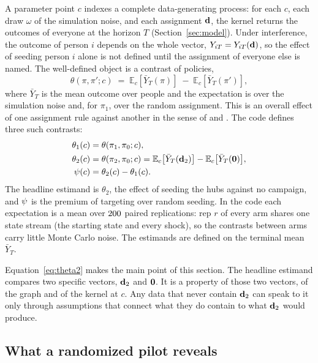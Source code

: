 A parameter point $c$ indexes a complete data-generating process: for each $c$,
each draw $\omega$ of the simulation noise, and each assignment $\mathbf{d}$, the
kernel returns the outcomes of everyone at the horizon $T$
(Section~\ref{sec:model}). Under interference, the outcome of person $i$ depends
on the whole vector, $Y_{iT}=Y_{iT}(\mathbf{d})$, so the effect of seeding person $i$
alone is not defined until the assignment of everyone else is named. The
well-defined object is a contrast of policies,
\begin{equation}\label{eq:theta}
  \theta(\pi,\pi';c)
  \;=\;
  \mathbb{E}_c\!\left[\bar Y_T(\pi)\right]
  \;-\;
  \mathbb{E}_c\!\left[\bar Y_T(\pi')\right],
\end{equation}
where $\bar Y_T$ is the mean outcome over people and the expectation is over the
simulation noise and, for $\pi_1$, over the random assignment. This is an overall
effect of one assignment rule against another in the sense of
\citet{halloran1995} and \citet{hudgens2008}. The code defines three such
contrasts:
\begin{align}
  \theta_1(c) &= \theta(\pi_1,\pi_0;c), \label{eq:theta1}\\
  \theta_2(c) &= \theta(\pi_2,\pi_0;c)
     = \mathbb{E}_c\bigl[\bar Y_T(\mathbf{d}_2)\bigr]-\mathbb{E}_c\bigl[\bar Y_T(\mathbf{0})\bigr],
     \label{eq:theta2}\\
  \psi(c) &= \theta_2(c)-\theta_1(c). \label{eq:premium}
\end{align}
The headline estimand is $\theta_2$, the effect of seeding the hubs against no
campaign, and $\psi$ is the premium of targeting over random seeding. In the
code each expectation is a mean over $200$ paired replications: rep $r$
of every arm shares one state stream (the starting state and every shock), so the
contrasts between arms carry little Monte Carlo noise. The estimands are defined
on the terminal mean $\bar Y_T$.

Equation~\eqref{eq:theta2} makes the main point of this section. The headline
estimand compares two specific vectors, $\mathbf{d}_2$ and $\mathbf{0}$. It is a property of
those two vectors, of the graph and of the kernel at $c$. Any data that never
contain $\mathbf{d}_2$ can speak to it only through assumptions that connect what they
do contain to what $\mathbf{d}_2$ would produce.

\subsection{What a randomized pilot reveals}

